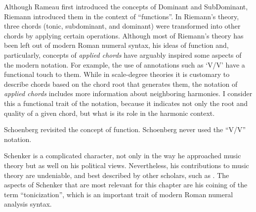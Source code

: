  Although Rameau first introduced the
concepts of Dominant and SubDominant, Riemann introduced
them in the context of ``functions''. In Riemann's theory,
three chords (tonic, subdominant, and dominant) were
transformed into other chords by applying certain
operations. Although most of Riemann's theory has been
left out of modern Roman numeral syntax, his ideas of
function and, particularly, concepts of \emph{applied
chords} have arguably inspired some aspects of the modern
notation. For example, the use of annotations such as
`V/V' have a functional touch to them. While in
scale-degree theories it is customary to describe chords
based on the chord root that generates them, the notation
of \emph{applied chords} includes more information about
neighboring harmonies. I consider this a functional trait
of the notation, because it indicates not only the root
and quality of a given chord, but what is its role in the
harmonic context.

 Schoenberg revisited the concept of
function. Schoenberg never used the ``V/V'' notation.

 Schenker is a complicated character, not
only in the way he approached music theory but as well on
his political views. Nevertheless, his contributions to
music theory are undeniable, and best described by other
scholars, such as \textcite{christensen2002heinrich}. The
aspects of Schenker that are most relevant for this
chapter are his coining of the term ``tonicization'',
which is an important trait of modern Roman numeral
analysis syntax.


